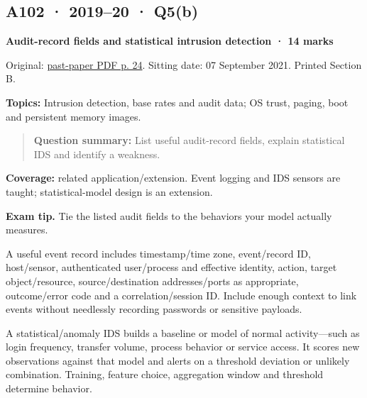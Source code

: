 \documentclass[11pt,a4paper]{article}
\begin{document}
\subsection{A102 · 2019–20 · Q5(b)}\label{a102}

\textbf{Audit-record fields and statistical intrusion detection · 14 marks}


Original: \href{../../CSE405-Security_Merged.pdf\#page=24}{past-paper PDF p. 24}. Sitting date: 07 September 2021. Printed Section B.


\textbf{Topics:} Intrusion detection,\allowbreak{} base rates and audit data; OS trust,\allowbreak{} paging,\allowbreak{} boot and persistent memory images.



\begin{quote}\small

\textbf{Question summary:} List useful audit-record fields,\allowbreak{} explain statistical IDS and identify a weakness.



\end{quote}

\textbf{Coverage:} related application/\allowbreak{}extension. Event logging and IDS sensors are taught; statistical-model design is an extension.



{\color{ForestGreen}\textbf{Exam tip.} Tie the listed audit fields to the behaviors your model actually measures.}


A useful event record includes timestamp/\allowbreak{}time zone,\allowbreak{} event/\allowbreak{}record ID,\allowbreak{} host/\allowbreak{}sensor,\allowbreak{} authenticated user/\allowbreak{}process and effective identity,\allowbreak{} action,\allowbreak{} target object/\allowbreak{}resource,\allowbreak{} source/\allowbreak{}destination addresses/\allowbreak{}ports as appropriate,\allowbreak{} outcome/\allowbreak{}error code and a correlation/\allowbreak{}session ID. Include enough context to link events without needlessly recording passwords or sensitive payloads.


A statistical/\allowbreak{}anomaly IDS builds a baseline or model of normal activity—such as login frequency,\allowbreak{} transfer volume,\allowbreak{} process behavior or service access. It scores new observations against that model and alerts on a threshold deviation or unlikely combination. Training,\allowbreak{} feature choice,\allowbreak{} aggregation window and threshold determine behavior.
\end{document}
